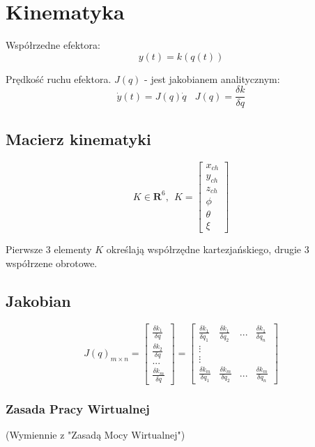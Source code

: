 \documentclass{article}
\begin{document}
\section{Kinematyka}

Współrzedne efektora:
$$
    y(t) = k( q(t) )
$$

Prędkość ruchu efektora. $J(q)$ - jest jakobianem analitycznym:
$$
    \dot{y}(t) = J(q) \dot{q}
    \ \ \ \
    J(q) = \frac{\delta k}{\delta q}
$$

\subsection{Macierz kinematyki}
\Large
$$
    K \in \textbf{R}^6, \ \
    K = \begin{bmatrix}
        x_{ch} \\
        y_{ch} \\
        z_{ch} \\
        \phi \\
        \theta \\
        \xi
    \end{bmatrix}
$$
\normalsize

Pierwsze 3 elementy $K$ określają współrzędne kartezjańskiego, drugie 3 współrzene obrotowe.

\subsection{Jakobian}
\Large
$$
    J(q)_{m\times n} = \begin{bmatrix}
        \frac{\delta k_1}{\delta q} \\
        \frac{\delta k_2}{\delta q} \\
        ... \\
        \frac{\delta k_m}{\delta q}
    \end{bmatrix}
    = \begin{bmatrix}
        \frac{\delta k_1}{\delta q_1} &
        \frac{\delta k_1}{\delta q_2} &
        ... &
        \frac{\delta k_1}{\delta q_n} \\
        \vdots \\
        \vdots \\
        \frac{\delta k_m}{\delta q_1} &
        \frac{\delta k_m}{\delta q_2} &
        ... &
        \frac{\delta k_m}{\delta q_n}
    \end{bmatrix}
$$
\normalsize

\subsubsection{Zasada Pracy Wirtualnej}
(Wymiennie z "Zasadą Mocy Wirtualnej")
\end{document}
